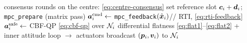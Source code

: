 \begin{algorithm}[t]
\caption{Distributed MPC step at agent $i$}
\label{alg:dmpc}
\DontPrintSemicolon
{}
consensus rounds on the centre: \cref{eq:centre-consensus}\;
set reference slot $\bm{c}_i+\bm{d}_i$; \texttt{mpc\_prepare} (matrix pass)\;
$\bm{a}_i^{\text{cmd}}\leftarrow$ \texttt{mpc\_feedback}$(\hat{\bm{x}}_i)$\hfill// RTI, \cref{eq:rti-feedback}\;
$\bm{a}_i^{\text{safe}}\leftarrow$ CBF-QP \cref{eq:cbf-qp} over $\mathcal{N}_i$\;
differential flatness \cref{eq:flat1}--\eqref{eq:flat2} + inner attitude loop
$\rightarrow$ actuators\;
broadcast $(\bm{p}_i,\bm{v}_i)$ to $\mathcal{N}_i$
\end{algorithm}
